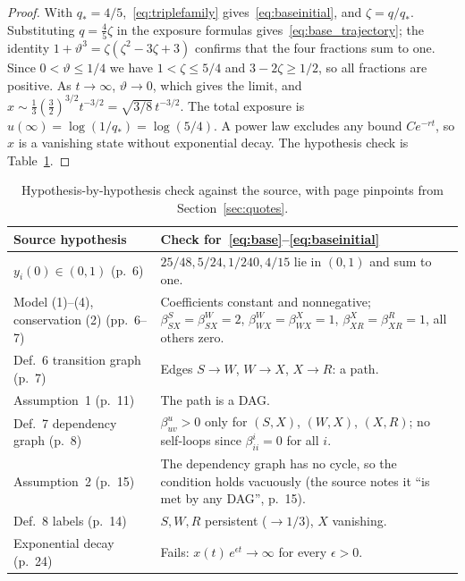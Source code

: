 \documentclass[11pt,a4paper]{article}
\theoremstyle{definition}\newtheorem{definition}[theorem]{Definition}
\theoremstyle{remark}\newtheorem{remark}[theorem]{Remark}
\begin{document}
\begin{proof}
With $q_*=4/5$,~\eqref{eq:triplefamily} gives~\eqref{eq:baseinitial},
and $\zeta=q/q_*$. Substituting $q=\tfrac45\zeta$ in the exposure
formulas gives~\eqref{eq:base_trajectory}; the identity
$1+\vartheta^3=\zeta(\zeta^2-3\zeta+3)$ confirms that the four
fractions sum to one. Since $0<\vartheta\le1/4$ we have
$1<\zeta\le5/4$ and $3-2\zeta\ge1/2$, so all fractions are positive.
As $t\to\infty$, $\vartheta\to0$, which gives the limit, and
$x\sim\tfrac13(\tfrac32)^{3/2}t^{-3/2}=\sqrt{3/8}\,t^{-3/2}$. The total
exposure is $u(\infty)=\log(1/q_*)=\log(5/4)$. A power law excludes any
bound $Ce^{-rt}$, so $x$ is a vanishing state without exponential
decay. The hypothesis check is Table~\ref{tab:hypcheck}.
\end{proof}

\begin{table}[ht]
\centering\small
\begin{tabularx}{\textwidth}{@{}p{3.6cm}X@{}}
\toprule
Source hypothesis & Check for~\eqref{eq:base}--\eqref{eq:baseinitial}\\
\midrule
$y_i(0)\in(0,1)$ (p.~6) & $25/48,5/24,1/240,4/15$ lie in $(0,1)$ and sum to one.\\
Model (1)--(4), conservation (2) (pp.~6--7) & Coefficients constant and nonnegative; $\beta^S_{SX}=\beta^W_{SX}=2$, $\beta^W_{WX}=\beta^X_{WX}=1$, $\beta^X_{XR}=\beta^R_{XR}=1$, all others zero.\\
Def.~6 transition graph (p.~7) & Edges $S\to W$, $W\to X$, $X\to R$: a path.\\
Assumption~1 (p.~11) & The path is a DAG.\\
Def.~7 dependency graph (p.~8) & $\beta^u_{uv}>0$ only for $(S,X)$, $(W,X)$, $(X,R)$; no self-loops since $\beta^i_{ii}=0$ for all $i$.\\
Assumption~2 (p.~15) & The dependency graph has no cycle, so the condition holds vacuously (the source notes it ``is met by any DAG'', p.~15).\\
Def.~8 labels (p.~14) & $S,W,R$ persistent ($\to1/3$), $X$ vanishing.\\
Exponential decay (p.~24) & Fails: $x(t)\,e^{\epsilon t}\to\infty$ for every $\epsilon>0$.\\
\bottomrule
\end{tabularx}
\caption{Hypothesis-by-hypothesis check against the source, with page
pinpoints from Section~\ref{sec:quotes}.}
\label{tab:hypcheck}
\end{table}
\end{document}
